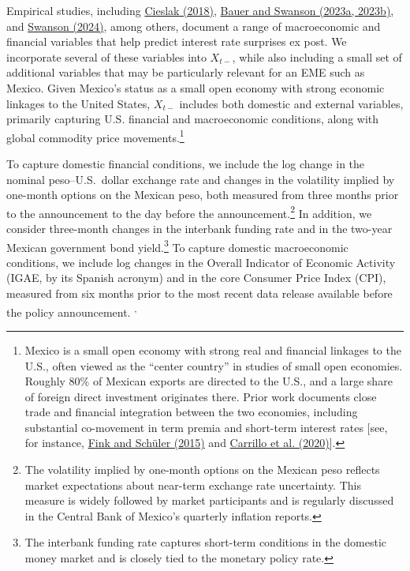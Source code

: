 \documentclass[12pt, reqno]{article}
\begin{document}
Empirical studies, including  \hyperlink{Cieslak (2018)}{Cieslak (2018)}, \hyperlink{Bauer and Swanson (2023a, 2023b)}{Bauer and Swanson (2023a, 2023b)}, and \hyperlink{Swanson (2024)}{Swanson (2024)}, among others, document a range of macroeconomic and financial variables that help predict interest rate surprises ex post. We incorporate several of these variables into $X_{t-}$, while also including a small set of additional variables that may be particularly relevant for an EME such as Mexico. Given Mexico’s status as a small open economy with strong economic linkages to the United States, $X_{t-}$ includes both domestic and external variables, primarily capturing U.S. financial and macroeconomic conditions, along with global commodity price movements.\footnote{Mexico is a small open economy with strong real and financial linkages to the U.S., often viewed as the “center country” in studies of small open economies. Roughly 80\% of Mexican exports are directed to the U.S., and a large share of foreign direct investment originates there. Prior work documents close trade and financial integration between the two economies, including substantial co-movement in term premia and short-term interest rates [see, for instance, \hyperlink{Fink (2015)}{Fink and Schüler (2015)} and \hyperlink{Carrillo et al. (2020)}{Carrillo et al. (2020)}].}


To capture domestic financial conditions, we include the log change in the nominal peso--U.S.\ dollar exchange rate and changes in the volatility implied by one-month options on the Mexican peso, both measured from three months prior to the announcement to the day before the announcement.\footnote{The volatility implied by one-month options on the Mexican peso reflects market expectations about near-term exchange rate uncertainty. This measure is widely followed by market participants and is regularly discussed in the Central Bank of Mexico’s quarterly inflation reports.} In addition, we consider three-month changes in the interbank funding rate and in the two-year Mexican government bond yield.\footnote{The interbank funding rate captures short-term conditions in the domestic money market and is closely tied to the monetary policy rate.}  To capture domestic macroeconomic conditions, we include log changes in the Overall Indicator of Economic Activity (IGAE, by its Spanish acronym) and in the core Consumer Price Index (CPI), measured from six months prior to the most recent data release available before the policy announcement.\footnotemark
{}\textsuperscript{,}\footnotemark
{}
\end{document}
